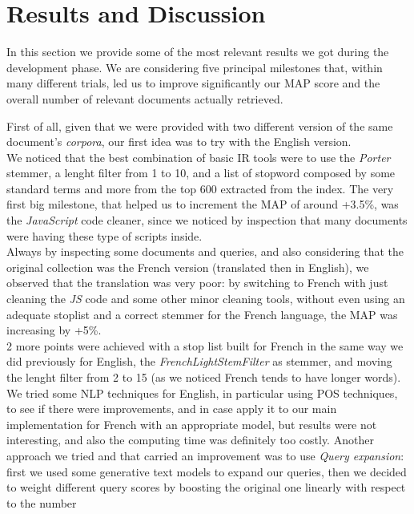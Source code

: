 \pagebreak
\section{Results and Discussion}

\label{sec:results}


In this section we provide some of the most relevant results we got during the development phase.
We are considering five principal milestones that, within many different trials, led us to improve significantly our \ac{MAP} score and the overall number of relevant documents actually retrieved.

First of all, given that we were provided with two different version of the same document's \textit{corpora}, our first idea was to try with the English version.\\ 
We noticed that the best combination of basic \ac{IR} tools were to use the \textit{Porter} stemmer, a lenght filter from 1 to 10, and a list of stopword composed by some standard terms and more from the top 600 extracted from the index.
The very first big milestone, that helped us to increment the \ac{MAP} of around +3.5\%, was the \textit{JavaScript} code cleaner, since we noticed by inspection that many documents were having these type of scripts inside.\\
Always by inspecting some documents and queries, and also considering that the original collection was the French version (translated then in English), we observed that the translation was very poor: by switching to French
with just cleaning the \textit{JS} code and some other minor cleaning tools, without even using an adequate stoplist and a correct stemmer for the French language, the \ac{MAP} was increasing by +5\%. \\
2 more points were achieved with a stop list built for French in the same way we did previously for English, the \textit{FrenchLightStemFilter} \cite{solrfrenchlightstemfilter} as stemmer, and moving the lenght filter from 2 to 15 (as we noticed French tends to have longer words). \\
We tried some \ac{NLP} techniques for English, in particular using \ac{POS} techniques, to see if there were improvements, and in case apply it to our main implementation for French with an appropriate model, but results 
were not interesting, and also the computing time was definitely too costly.
Another approach we tried and that carried an improvement was to use \textit{Query expansion}: first we used some generative text models to expand our queries, then we decided to weight different query scores by boosting the original one linearly with respect to the number
